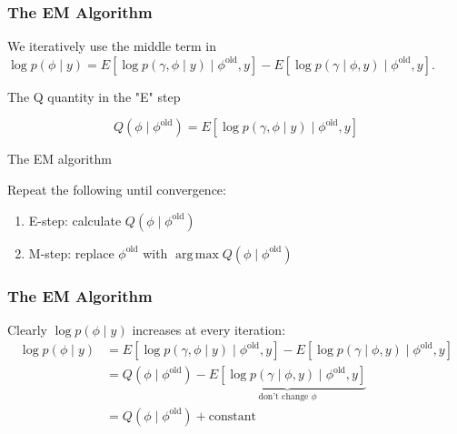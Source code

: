 \documentclass{beamer}
\DeclareMathOperator*{\argmax}{arg\,max}
\begin{document}
\begin{frame}[fragile]
\frametitle{The EM Algorithm}

We iteratively use the middle term in
$\log p(\phi \mid y) =  E\left[ \log p(\gamma, \phi \mid y) \mid \phi^{\text{old}}, y \right] - E\left[\log p(\gamma \mid \phi, y) \mid \phi^{\text{old}}, y \right]$.

\begin{block}{The Q quantity in the "E" step}

$$
Q(\phi \mid \phi^{\text{old}}) = E\left[ \log p(\gamma, \phi \mid y) \mid \phi^{\text{old}}, y \right]
$$
\end{block}
\pause

\begin{block}{The EM algorithm}

Repeat the following until convergence:
\begin{enumerate}
\item E-step: calculate $Q(\phi \mid \phi^{\text{old}})$
\item M-step: replace $\phi^{\text{old}}$ with $\argmax Q(\phi \mid \phi^{\text{old}})$
\end{enumerate}
\end{block}
\end{frame}

\begin{frame}[fragile]
\frametitle{The EM Algorithm}

Clearly $\log p(\phi \mid y)$ increases at every iteration:
\begin{align*}
\log p(\phi \mid y) &=  E\left[ \log p(\gamma, \phi \mid y) \mid \phi^{\text{old}}, y \right] - E\left[\log p(\gamma \mid \phi, y) \mid \phi^{\text{old}}, y \right]\\
&= Q(\phi \mid \phi^{\text{old}}) - \underbrace{E\left[\log p(\gamma \mid \phi, y) \mid \phi^{\text{old}}, y \right]}_{\text{don't change } \phi} \\
&= Q(\phi \mid \phi^{\text{old}}) + \text{constant}
\end{align*}


\end{frame}
\end{document}
